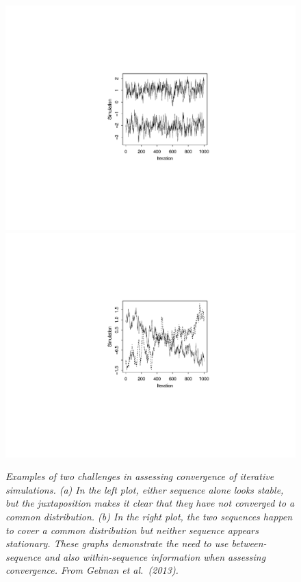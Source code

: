 \documentclass[11pt]{article}
\begin{document}
\begin{figure}
\vspace{-.22\textwidth}
\centerline{\hspace{-.1\textwidth}\includegraphics[width=\textwidth]{convergechallenge1.pdf}\hspace{-.5\textwidth}\includegraphics[width=\textwidth]{convergechallenge2.pdf}}
\vspace{-.22\textwidth}
\caption{\em Examples of two challenges in assessing convergence of iterative simulations.  (a) In the left plot, either sequence alone looks stable, but the juxtaposition makes it clear that they have not converged to a common distribution. (b) In the right plot, the two sequences happen to cover a common distribution but neither sequence appears stationary.   These graphs demonstrate the need to use between-sequence and also within-sequence information when assessing convergence. From Gelman et al.\ (2013).}
\label{converge.challenge}
\end{figure}
\end{document}
